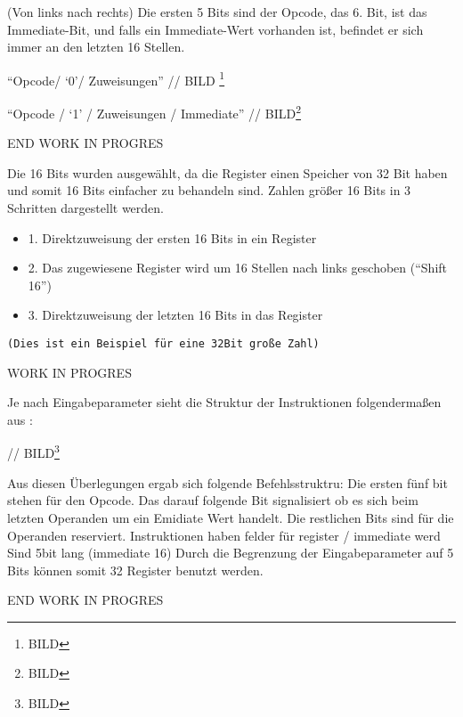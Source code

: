 \documentclass[paper=a4,fontsize=12pt,twocolumn]{scrreprt}
\begin{document}
(Von links nach rechts) Die ersten 5 Bits sind der Opcode, das 6. Bit, ist das Immediate-Bit, und falls ein Immediate-Wert vorhanden ist, befindet er sich immer an den letzten 16 Stellen.

\enquote{Opcode/ \enquote{0}/ Zuweisungen}  // BILD \footnote{BILD}

\enquote{Opcode / \enquote{1} / Zuweisungen / Immediate} // BILD\footnote{BILD}

{\color{green}END WORK IN PROGRES}

{\color{red}
Die 16 Bits wurden ausgewählt, da die Register einen Speicher von 32 Bit haben und somit 16 Bits einfacher zu behandeln sind. Zahlen größer 16 Bits in 3 Schritten dargestellt werden. 
\begin{itemize}
    \item 1. Direktzuweisung der ersten 16 Bits in ein Register
    \item 2. Das zugewiesene Register wird um 16 Stellen nach links geschoben (\enquote{Shift 16})
    \item 3. Direktzuweisung der letzten 16 Bits in das Register
\end{itemize}
    \texttt{(Dies ist ein Beispiel für eine 32Bit große Zahl)}
}

{\color{green} WORK IN PROGRES}

Je nach Eingabeparameter sieht die Struktur der Instruktionen folgendermaßen aus :

// BILD\footnote{BILD}

Aus diesen Überlegungen ergab sich folgende Befehlsstruktru: Die ersten fünf bit stehen für den Opcode.
Das darauf folgende Bit signalisiert ob es sich beim letzten Operanden um ein Emidiate Wert handelt.
Die restlichen Bits sind für die Operanden reserviert.
Instruktionen haben felder für register / immediate werd
Sind 5bit lang (immediate 16)
Durch die Begrenzung der Eingabeparameter auf 5 Bits können somit 32 Register benutzt werden.

{\color{green}END WORK IN PROGRES}

\end{document}

